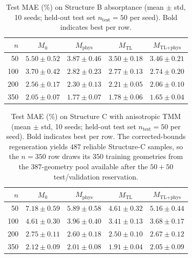 \documentclass[a4paper,fleqn]{cas-sc}
\newcommand{\Mzero}{M_0}
\newcommand{\Mphys}{M_\text{phys}}
\newcommand{\Mtl}{M_\text{TL}}
\newcommand{\Mtlphys}{M_\text{TL+phys}}
\begin{document}
\begin{table}[htbp]\centering\small
\caption{Test MAE (\%) on Structure B absorptance (mean $\pm$ std, 10 seeds; held-out test set $n_\text{test}=50$ per seed). Bold indicates best per row.}
\label{tab:pbtl_b}
\begin{tabular}{r cccc}\toprule
$n$ & $\Mzero$ & $\Mphys$ & $\Mtl$ & $\Mtlphys$ \\\midrule
50 & $5.50 \pm 0.52$ & $3.87 \pm 0.46$ & $3.50 \pm 0.18$ & $\mathbf{3.46 \pm 0.21}$\\
100 & $3.70 \pm 0.42$ & $2.82 \pm 0.23$ & $2.77 \pm 0.13$ & $\mathbf{2.74 \pm 0.20}$\\
200 & $2.56 \pm 0.17$ & $2.30 \pm 0.13$ & $2.21 \pm 0.05$ & $\mathbf{2.06 \pm 0.10}$\\
350 & $2.05 \pm 0.07$ & $1.77 \pm 0.07$ & $1.78 \pm 0.06$ & $\mathbf{1.65 \pm 0.04}$\\
\bottomrule
\end{tabular}
\end{table}

\begin{table}[htbp]\centering\small
\caption{Test MAE (\%) on Structure C with anisotropic TMM (mean $\pm$ std, 10 seeds; held-out test set $n_\text{test}=50$ per seed). Bold indicates best per row. The corrected-bounds regeneration yields $487$ reliable Structure-C samples, so the $n=350$ row draws its $350$ training geometries from the $387$-geometry pool available after the $50{+}50$ test/validation reservation.}
\label{tab:pbtl_c}
\begin{tabular}{r cccc}\toprule
$n$ & $\Mzero$ & $\Mphys$ & $\Mtl$ & $\Mtlphys$ \\\midrule
50 & $7.18 \pm 0.59$ & $5.89 \pm 0.58$ & $\mathbf{4.61 \pm 0.32}$ & $5.16 \pm 0.44$\\
100 & $4.61 \pm 0.30$ & $3.96 \pm 0.40$ & $\mathbf{3.41 \pm 0.13}$ & $3.68 \pm 0.17$\\
200 & $2.75 \pm 0.11$ & $2.60 \pm 0.18$ & $\mathbf{2.50 \pm 0.10}$ & $2.67 \pm 0.12$\\
350 & $2.12 \pm 0.09$ & $2.01 \pm 0.08$ & $\mathbf{1.91 \pm 0.04}$ & $2.05 \pm 0.09$\\
\bottomrule
\end{tabular}
\end{table}
\end{document}
